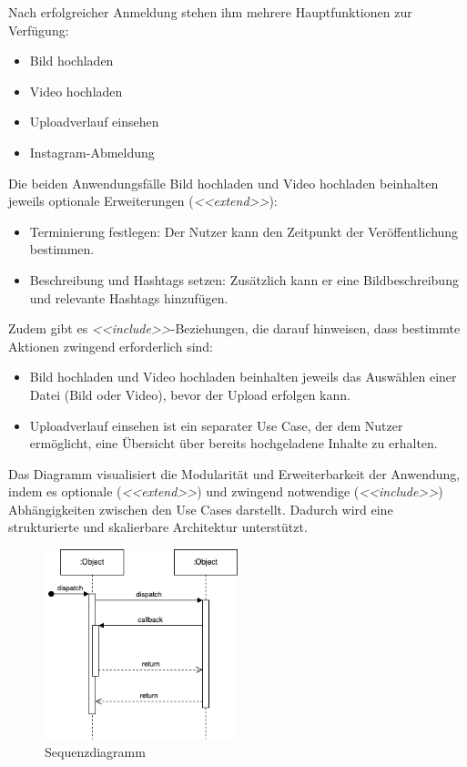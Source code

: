 Nach erfolgreicher Anmeldung stehen ihm mehrere Hauptfunktionen zur Verfügung:
\begin{itemize}
    \item Bild hochladen
    \item Video hochladen
    \item Uploadverlauf einsehen
    \item Instagram-Abmeldung
\end{itemize}

Die beiden Anwendungsfälle Bild hochladen und Video hochladen beinhalten jeweils optionale Erweiterungen (\textit{<<extend>>}):
\begin{itemize}
    \item Terminierung festlegen: Der Nutzer kann den Zeitpunkt der Veröffentlichung bestimmen.
    \item Beschreibung und Hashtags setzen: Zusätzlich kann er eine Bildbeschreibung und relevante Hashtags hinzufügen.
\end{itemize}

Zudem gibt es \textit{<<include>>}-Beziehungen, die darauf hinweisen, dass bestimmte Aktionen zwingend erforderlich sind:
\begin{itemize}
    \item Bild hochladen und Video hochladen beinhalten jeweils das Auswählen einer Datei (Bild oder Video), bevor der Upload erfolgen kann.
    \item Uploadverlauf einsehen ist ein separater Use Case, der dem Nutzer ermöglicht, eine Übersicht über bereits hochgeladene Inhalte zu erhalten.
\end{itemize}

Das Diagramm visualisiert die Modularität und Erweiterbarkeit der Anwendung, indem es optionale (\textit{<<extend>>}) und zwingend notwendige (\textit{<<include>>}) 
Abhängigkeiten zwischen den Use Cases darstellt. Dadurch wird eine strukturierte und skalierbare Architektur unterstützt.

\begin{figure}[htb]
    \centering
    \includegraphics[width=0.5\textwidth]{graphics/sequence_diagram.png}
    \caption{Sequenzdiagramm}
    \label{fig:fig-4}
\end{figure}


